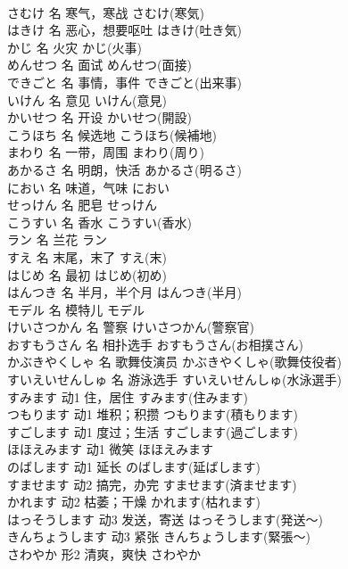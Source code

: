 \documentclass[8pt]{extreport}
\begin{document}
\begin{CJK}{UTF8}{min}
\\	さむけ	名	寒气，寒战	さむけ(寒気)	
\\	はきけ	名	恶心，想要呕吐	はきけ(吐き気)	
\\	かじ	名	火灾	かじ(火事)	
\\	めんせつ	名	面试	めんせつ(面接)	
\\	できごと	名	事情，事件	できごと(出来事)	
\\	いけん	名	意见	いけん(意見)	
\\	かいせつ	名	开设	かいせつ(開設)	
\\	こうほち	名	候选地	こうほち(候補地)	
\\	まわり	名	一带，周围	まわり(周り)	
\\	あかるさ	名	明朗，快活	あかるさ(明るさ)	
\\	におい	名	味道，气味	におい	
\\	せっけん	名	肥皂	せっけん	
\\	こうすい	名	香水	こうすい(香水)	
\\	ラン	名	兰花	ラン	
\\	すえ	名	末尾，末了	すえ(末)	
\\	はじめ	名	最初	はじめ(初め)	
\\	はんつき	名	半月，半个月	はんつき(半月)	
\\	モデル	名	模特儿	モデル	
\\	けいさつかん	名	警察	けいさつかん(警察官)	
\\	おすもうさん	名	相扑选手	おすもうさん(お相撲さん)	
\\	かぶきやくしゃ	名	歌舞伎演员	かぶきやくしゃ(歌舞伎役者)	
\\	すいえいせんしゅ	名	游泳选手	すいえいせんしゅ(水泳選手)	
\\	すみます	动1	住，居住	すみます(住みます)	
\\	つもります	动1	堆积；积攒	つもります(積もります)	
\\	すごします	动1	度过；生活	すごします(過ごします)	
\\	ほほえみます	动1	微笑	ほほえみます	
\\	のばします	动1	延长	のばします(延ばします)	
\\	すませます	动2	搞完，办完	すませます(済ませます)	
\\	かれます	动2	枯萎；干燥	かれます(枯れます)	
\\	はっそうします	动3	发送，寄送	はっそうします(発送～)	
\\	きんちょうします	动3	紧张	きんちょうします(緊張～)	
\\	さわやか	形2	清爽，爽快	さわやか	

\end{CJK}
\end{document}
